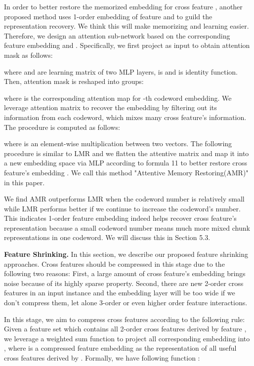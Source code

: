 \documentclass[sigconf,authorversion]{acmart}
\begin{document}
In order to better restore the memorized embedding for cross feature , another proposed method uses  1-order embedding of feature  and  to guild the representation recovery. We think this will make memorizing and learning easier. Therefore, we design an attention sub-network based on the corresponding feature embedding  and . Specifically,  we first project  as input to obtain attention mask  as follows:


 where   and  are 
learning matrix of two MLP layers,  is  and  is identity function. Then, attention mask  is reshaped into  groups:
  
where  is the corresponding attention map for -th codeword embedding. We leverage attention matrix  to recover the embedding by filtering out its information from each codeword, which mixes many cross feature's information. The procedure is computed as follows:
  
 where   is an element-wise multiplication between two vectors. The following procedure is similar to LMR and we flatten the attentive matrix  and map it into a new embedding space via MLP according to formula 11 to better restore cross feature's embedding . We call this method "Attentive Memory Restoring(AMR)" in this paper.

 We find AMR outperforms LMR when the codeword number is relatively small while LMR performs better if we continue to increase the codeword's number. This indicates 1-order feature embedding indeed helps recover cross feature's representation because a small codeword number means much more mixed chunk representations in one codeword. We will discuss this in Section 5.3.
 
\textbf{Feature Shrinking.}
In this section, we describe our proposed feature shrinking approaches. Cross features should be compressed in this stage due to the following two reasons: First, a large amount of cross feature's embedding brings noise because of its highly sparse property. Second, there are  new 2-order cross features in an input instance and the embedding layer will be too wide if we don't compress them, let alone 3-order or even higher order feature interactions.

In this stage, we aim to compress cross features according to the following rule: Given a feature set  which contains all 2-order cross features derived by feature , we leverage a weighted sum function  to project all corresponding embedding into , where  is a compressed feature embedding as the representation of all useful cross features derived by . Formally, we have following function :
 
\end{document}
